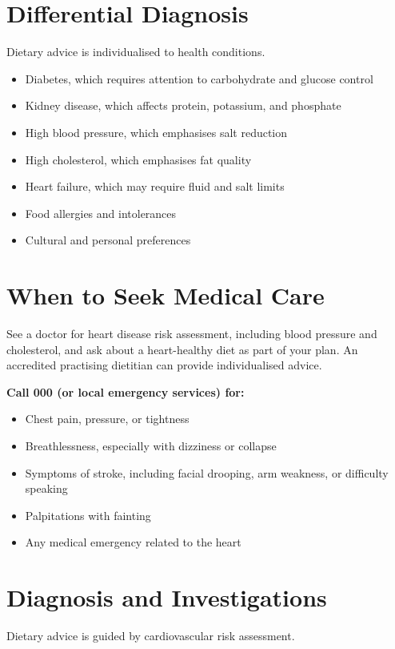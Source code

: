 \section*{Differential Diagnosis}
Dietary advice is individualised to health conditions.

\begin{itemize}
    \item Diabetes, which requires attention to carbohydrate and glucose control
    \item Kidney disease, which affects protein, potassium, and phosphate
    \item High blood pressure, which emphasises salt reduction
    \item High cholesterol, which emphasises fat quality
    \item Heart failure, which may require fluid and salt limits
    \item Food allergies and intolerances
    \item Cultural and personal preferences
\end{itemize}

\section*{When to Seek Medical Care}
See a doctor for heart disease risk assessment, including blood pressure and cholesterol, and ask about a heart-healthy diet as part of your plan. An accredited practising dietitian can provide individualised advice.

\textbf{Call 000 (or local emergency services) for:}
\begin{itemize}
    \item Chest pain, pressure, or tightness
    \item Breathlessness, especially with dizziness or collapse
    \item Symptoms of stroke, including facial drooping, arm weakness, or difficulty speaking
    \item Palpitations with fainting
    \item Any medical emergency related to the heart
\end{itemize}

\section*{Diagnosis and Investigations}
Dietary advice is guided by cardiovascular risk assessment.

